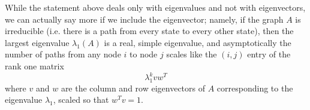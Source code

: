 \documentclass[12pt, leqno]{article}
\begin{document}
While the statement above deals only with eigenvalues and not with
eigenvectors, we can actually say more if we include the eigenvector;
namely, if the graph $A$ is irreducible (i.e. there is a path from
every state to every other state), then the largest eigenvalue
$\lambda_1(A)$ is a real, simple eigenvalue, and asymptotically the number
of paths from any node $i$ to node $j$ scales like the $(i,j)$ entry
of the rank one matrix
\[
  \lambda_1^k v w^T
\]
where $v$ and $w$ are the column and row eigenvectors of $A$
corresponding to the eigenvalue $\lambda_1$, scaled so that $w^T v = 1$.
\end{document}
